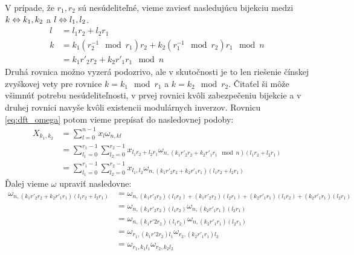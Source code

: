 V prípade, že $r_1,r_2$ sú nesúdeliteľné, vieme zaviesť nasledujúcu
bijekciu medzi $k \Leftrightarrow k_1,k_2$ a $l \Leftrightarrow l_1,l_2$.
\begin{align}
    l &= l_1 r_2 + l_2 r_1 \\    
    k &= k_1 ( r_2^{-1} \mod r_1) r_2 +
        k_2 ( r_1^{-1} \mod r_2) r_1 \mod n \\&=
        k_1 r'_2 r_2 + k_2 r'_1 r_1 \mod n
\end{align}
Druhá rovnica možno vyzerá podozrivo, ale v skutočnosti je to len
riešenie čínskej zvyškovej vety pre rovnice
$k = k_1 \mod r_1$ a $k = k_2 \mod r_2$. Čitaťel ši môže všimnúť
potrebu nesúdeliteľnosti, v prvej rovnici kvôli zabezpečeniu bijekcie
a v druhej rovnici navyše kvôli existencii modulárnych inverzov.
Rovnicu \ref{eq:dft_omega} potom vieme prepísať do nasledovnej podoby:
\begin{equation}
    \begin{split}
    X_{k_1,k_2} &= \sum_{l=0}^{n-1} x_l \omega_{n,kl} \\
            &= \sum_{l_1=0}^{r_1-1} \sum_{l_2=0}^{r_2-1}
              x_{l_1 r_2 + l_2 r_1} 
              \omega_{n,(k_1 r'_2 r_2 + k_2 r'_1 r_1 \mod n) 
                            (l_1 r_2 + l_2 r_1)}  \\
            &= \sum_{l_1=0}^{r_1-1} \sum_{l_2=0}^{r_2-1}
              x_{l_1, l_2} 
              \omega_{n,(k_1 r'_2 r_2 + k_2 r'_1 r_1) 
                            (l_1 r_2 + l_2 r_1)}
    \end{split}
    \label{eq:gt_odvodenie1}
\end{equation}
Ďalej vieme $\omega$ upraviť nasledovne:
\begin{equation}
    \begin{split}
    \omega_{n,(k_1 r'_2 r_2 + k_2 r'_1 r_1) 
                            (l_1 r_2 + l_2 r_1)} &=
    \omega_{n, (k_1 r'_2 r_2)(l_1 r_2) +
                (k_1 r'_2 r_2)(l_2 r_1) +
                (k_2 r'_1 r_1)(l_1 r_2) +
                (k_2 r'_1 r_1)(l_2 r_1)} \\
    &=
    \omega_{n, (k_1 r'_2 r_2)(l_1 r_2)} 
    \omega_{n, (k_2 r'_1 r_1)(l_2 r_1)} \\
    &=
    \omega_{n, (k_1 r'2 r_2)(l_1 r_2)} 
    \omega_{n, (k_2 r'_1 r_1)(l_2 r_1)} \\
    &=
    \omega_{r_1, (k_1 r'2 r_2)l_1} 
    \omega_{r_2, (k_2 r'_1 r_1)l_2} \\
    &=
    \omega_{r_1, k_1 l_1} 
    \omega_{r_2, k_2 l_2} \\    
    \end{split}
\end{equation}
